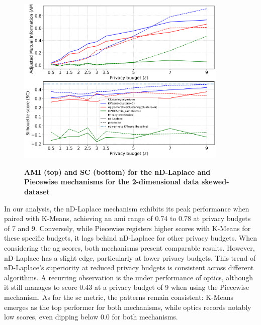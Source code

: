 \newpage
\begin{figure}[H]
  \centering
  \caption{\textbf{AMI (top) and SC (bottom) for the nD-Laplace and Piecewise mechanisms for the 2-dimensional data skewed-dataset}}
  \includegraphics[width=0.9\textwidth]{Results/nd-laplace/nd-Laplace/skewed-dataset/ami-and-sc_2_dimensions.png}
  \label{fig:validation-skewed-dataset_comparison_2d-laplace}
\end{figure}
In our analysis, the nD-Laplace mechanism exhibits its peak performance when paired with K-Means, achieving an \gls{ami} range of 0.74 to 0.78 at privacy budgets of 7 and 9. Conversely, while Piecewise registers higher scores with K-Means for these specific budgets, it lags behind nD-Laplace for other privacy budgets. When considering the \gls{ag} scores, both mechanisms present comparable results. However, nD-Laplace has a slight edge, particularly at lower privacy budgets. This trend of nD-Laplace's superiority at reduced privacy budgets is consistent across different algorithms. A recurring observation is the under performance of \gls{optics}, although it still manages to score 0.43 at a privacy budget of 9 when using the Piecewise mechanism. As for the \gls{sc} metric, the patterns remain consistent: K-Means emerges as the top performer for both mechanisms, while \gls{optics} records notably low scores, even dipping below 0.0 for both mechanisms.

\newpage
